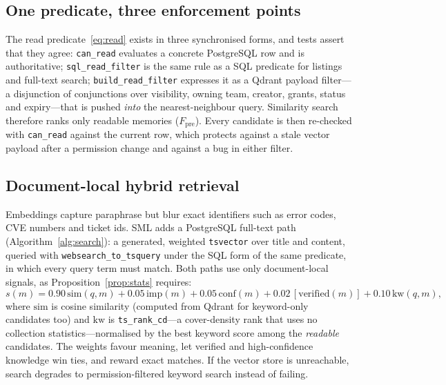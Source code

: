 \documentclass[11pt,a4paper]{article}
\theoremstyle{remark}
\newcommand{\sys}{SML}
\begin{document}
\subsection{One predicate, three enforcement points}
\label{sec:access}

The read predicate~\eqref{eq:read} exists in three synchronised forms, and tests assert that they agree:
\texttt{can\_read} evaluates a concrete PostgreSQL row and is authoritative; \texttt{sql\_read\_filter} is the
same rule as a SQL predicate for listings and full-text search; \texttt{build\_read\_filter} expresses it as a
Qdrant payload filter---a disjunction of conjunctions over visibility, owning team, creator, grants, status and
expiry---that is pushed \emph{into} the nearest-neighbour query. Similarity search therefore ranks only readable
memories ($F_{\mathrm{pre}}$). Every candidate is then re-checked with \texttt{can\_read} against the current row,
which protects against a stale vector payload after a permission change and against a bug in either filter.

\subsection{Document-local hybrid retrieval}
\label{sec:retrieval}

Embeddings capture paraphrase but blur exact identifiers such as error codes, CVE numbers and ticket ids. \sys{}
adds a PostgreSQL full-text path~\cite{postgres2023fts} (Algorithm~\ref{alg:search}): a generated, weighted \texttt{tsvector} over title and content,
queried with \texttt{websearch\_to\_tsquery} under the SQL form of the same predicate, in which every query term
must match. Both paths use only document-local signals, as Proposition~\ref{prop:stats} requires:
\begin{equation}
s(m) = 0.90\,\mathrm{sim}(q,m) + 0.05\,\mathrm{imp}(m) + 0.05\,\mathrm{conf}(m) + 0.02\,[\mathrm{verified}(m)] + 0.10\,\mathrm{kw}(q,m),
\label{eq:score}
\end{equation}
where $\mathrm{sim}$ is cosine similarity (computed from Qdrant for keyword-only candidates too) and $\mathrm{kw}$ is
\texttt{ts\_rank\_cd}---a cover-density rank that uses no collection statistics---normalised by the best keyword
score among the \emph{readable} candidates. The weights favour meaning, let verified and high-confidence knowledge win
ties, and reward exact matches. If the vector store is unreachable, search degrades to permission-filtered keyword
search instead of failing.
\end{document}
